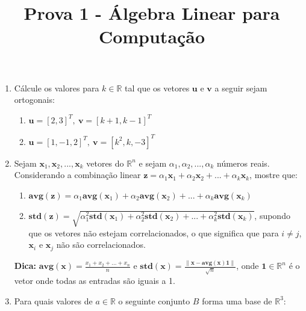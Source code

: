 \documentclass[a4paper,12pt]{article}
\title{Prova 1 - Álgebra Linear para Computação}
\date{}
\newcommand{\avg}{\mathbf{\textbf{avg}}}
\newcommand{\std}{\mathbf{\textbf{std}}}
\begin{document}
\maketitle
\vspace{-4em}
\begin{enumerate}
    \item Cálcule os valores para $k \in \mathbb{R}$ tal que os vetores $\mathbf{u}$ e $\mathbf{v}$ a seguir sejam ortogonais:
    \begin{enumerate}
        \item $\mathbf{u} = [2,3]^T,\ \mathbf{v} = [k+1,k-1]^T$
        \item $\mathbf{u} = [1,-1,2]^T,\ \mathbf{v} = [k^2,k,-3]^T$
    \end{enumerate}
    \item Sejam $\mathbf{x}_{1},\mathbf{x}_{2},...,\mathbf{x}_{k}$ vetores do $\mathbb{R}^n$ e sejam $\alpha_1,\alpha_2,...,\alpha_k$ números reais. Considerando a combinação linear $\mathbf{z} = \alpha_1\mathbf{x}_{1} +\alpha_2\mathbf{x}_{2} + ... +\alpha_k\mathbf{x}_{k}$, mostre que:
    \begin{enumerate}
        \item $\avg(\mathbf{z}) = \alpha_1\avg(\mathbf{x}_1) + \alpha_2\avg(\mathbf{x}_2) + ... + \alpha_k\avg(\mathbf{x}_k)$
        \item $\std(\mathbf{z}) = \sqrt{\alpha_1^2\std(\mathbf{x}_1)+ \alpha_2^2\std(\mathbf{x}_2)+...+\alpha_k^2\std(\mathbf{x}_k)}$, supondo que os vetores não estejam correlacionados, o que significa que para $i\neq j$, $\mathbf{x}_i$ e $\mathbf{x}_j$ não são correlacionados.
    \end{enumerate}
    \textbf{Dica: }$\avg(\mathbf{x}) = \frac{x_1 + x_2 + ... + x_n}{n}$ e $\std(\mathbf{x}) = \frac{\|\mathbf{x} - \avg(\mathbf{x})\mathbf{1}\|}{\sqrt{n}}$, onde $\mathbf{1} \in \mathbb{R}^n$ é o vetor onde todas as entradas são iguais a 1.
    \item Para quais valores de $a \in \mathbb{R}$ o seguinte conjunto $B$ forma uma base de $\mathbb{R}^3$:

\end{enumerate}
\end{document}
